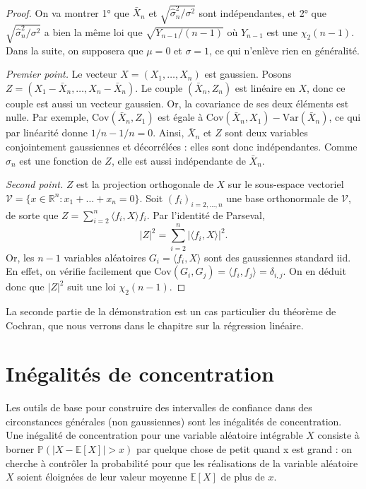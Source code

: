 \documentclass[
  10,
  letterpaper,
  DIV=11,
  numbers=noendperiod]{scrreport}
\theoremstyle{plain}
\theoremstyle{definition}
\theoremstyle{plain}
\theoremstyle{definition}
\theoremstyle{definition}
\theoremstyle{plain}
\theoremstyle{remark}
\begin{document}
\(~~\)

\begin{proof}

On va montrer 1° que \(\bar{X}_n\) et
\(\sqrt{\hat{\sigma}^2_n / \sigma^2}\) sont indépendantes, et 2° que
\(\sqrt{\hat{\sigma}^2_n / \sigma^2}\) a bien la même loi que
\(\sqrt{Y_{n-1}/(n-1)}\) où \(Y_{n-1}\) est une \(\chi_2(n-1)\). Dans la
suite, on supposera que \(\mu=0\) et \(\sigma=1\), ce qui n'enlève rien
en généralité.

\emph{Premier point. } Le vecteur \(X=(X_1, \dotsc, X_n)\) est gaussien.
Posons \(Z = (X_1 - \bar{X}_n, \dotsc, X_n - \bar{X}_n)\). Le couple
\((\bar{X}_n, Z_n)\) est linéaire en \(X\), donc ce couple est aussi un
vecteur gaussien. Or, la covariance de ses deux éléments est nulle. Par
exemple, \(\mathrm{Cov}(\bar{X}_n, Z_1)\) est égale à
\(\mathrm{Cov}(\bar{X}_n, X_1) - \mathrm{Var}(\bar{X}_n)\), ce qui par
linéarité donne \(1/n - 1/n = 0\). Ainsi, \(\bar{X}_n\) et \(Z\) sont
deux variables conjointement gaussiennes et décorrélées : elles sont
donc indépendantes. Comme \(\hat{\sigma}_n\) est une fonction de \(Z\),
elle est aussi indépendante de \(\bar{X}_n\).

\emph{Second point. } \(Z\) est la projection orthogonale de \(X\) sur
le sous-espace vectoriel
\(\mathscr{V}=\{x \in \mathbb{R}^n : x_1 + \dotsc + x_n = 0\}\). Soit
\((f_i)_{i=2, \dotsc, n}\) une base orthonormale de \(\mathscr{V}\), de
sorte que \(Z = \sum_{i=2}^n \langle f_i, X\rangle f_i\). Par l'identité
de Parseval, \[|Z|^2 = \sum_{i=2}^n |\langle f_i, X \rangle|^2.\] Or,
les \(n-1\) variables aléatoires \(G_i = \langle f_i, X\rangle\) sont
des gaussiennes standard iid. En effet, on vérifie facilement que
\(\mathrm{Cov}(G_i, G_j) = \langle f_i, f_j\rangle = \delta_{i,j}\). On
en déduit donc que \(|Z|^2\) suit une loi \(\chi_2(n-1)\).

\end{proof}

La seconde partie de la démonstration est un cas particulier du théorème
de Cochran, que nous verrons dans le chapitre sur la régression
linéaire.

\hypertarget{inuxe9galituxe9s-de-concentration}{%
\section{Inégalités de
concentration}\label{inuxe9galituxe9s-de-concentration}}

Les outils de base pour construire des intervalles de confiance dans des
circonstances générales (non gaussiennes) sont les inégalités de
concentration. Une inégalité de concentration pour une variable
aléatoire intégrable \(X\) consiste à borner
\(\mathbb{P}(|X - \mathbb{E}[X]|>x)\) par quelque chose de petit quand x
est grand : on cherche à contrôler la probabilité pour que les
réalisations de la variable aléatoire \(X\) soient éloignées de leur
valeur moyenne \(\mathbb{E}[X]\) de plus de \(x\).
\end{document}
